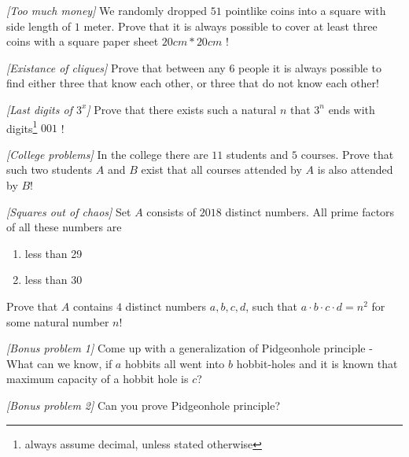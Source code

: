 \begin{problem}
\textit{[Too much money]}
We randomly dropped $51$ pointlike coins into a square with side length of $1$ meter. Prove that it is always possible to cover at least three coins with a square paper sheet $20cm * 20cm$ !
\end{problem}

\begin{problem}
\textit{[Existance of cliques]}
Prove that between any $6$ people it is always possible to find either three that know each other, or three that do not know each other!
\end{problem}

\begin{problem}
\textit{[Last digits of $3^x$]}
Prove that there exists such a natural $n$ that $3^n$ ends with digits\footnote{always assume decimal, unless stated otherwise} $001$ !
\end{problem}

\begin{problem}
\textit{[College problems]}
In the college there are $11$ students and $5$ courses. Prove that such two students $A$ and $B$ exist that all courses attended by $A$ is also attended by $B$!  
\end{problem}

\begin{problem}
\textit{[Squares out of chaos]}
Set $A$ consists of $2018$ distinct numbers. All prime factors of all these numbers are
\renewcommand{\labelenumi}{\alph{enumi})}
\begin{enumerate}
\item
less than 29
\item
less than 30
\end{enumerate}
Prove that $A$ contains $4$ distinct numbers $a,b,c,d$, such that $a\cdot b \cdot c \cdot d = n^2$ for some natural number $n$!
\end{problem}

\begin{problem}
\textit{[Bonus problem 1]}
Come up with a generalization of Pidgeonhole principle - What can we know, if $a$ hobbits all went into $b$ hobbit-holes and it is known that maximum capacity of a hobbit hole is $c$?
\end{problem}

\begin{problem}
\textit{[Bonus problem 2]}
Can you prove Pidgeonhole principle?
\end{problem}


